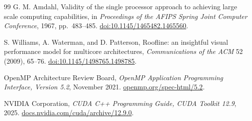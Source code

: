 \begin{thebibliography}{99}
G. M. Amdahl,
Validity of the single processor approach to achieving large scale computing capabilities,
in \emph{Proceedings of the AFIPS Spring Joint Computer Conference}, 1967, pp.~483--485.
\href{https://doi.org/10.1145/1465482.1465560}{doi:10.1145/1465482.1465560}.

S. Williams, A. Waterman, and D. Patterson,
Roofline: an insightful visual performance model for multicore architectures,
\emph{Communications of the ACM} 52 (2009), 65--76.
\href{https://doi.org/10.1145/1498765.1498785}{doi:10.1145/1498765.1498785}.

OpenMP Architecture Review Board,
\emph{OpenMP Application Programming Interface, Version 5.2}, November 2021.
\href{https://www.openmp.org/spec-html/5.2/openmp.html}{openmp.org/spec-html/5.2}.

NVIDIA Corporation,
\emph{CUDA C++ Programming Guide, CUDA Toolkit 12.9}, 2025.
\href{https://docs.nvidia.com/cuda/archive/12.9.0/cuda-c-programming-guide/contents.html}{docs.nvidia.com/cuda/archive/12.9.0}.

\end{thebibliography}
